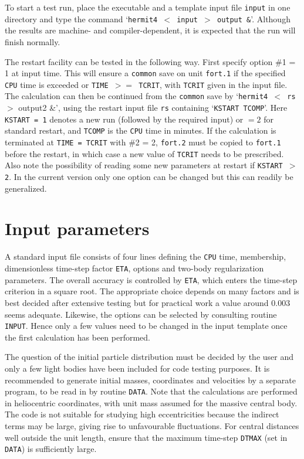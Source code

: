 \documentclass[12pt]{article}
\begin{document}
To start a test run, place the executable and a template input file
{\tt input} in one directory and type the command
`{\tt hermit4 $<$ input $>$ output \&}'.
Although the results are machine- and compiler-dependent, it is expected that
the run will finish normally.

The restart facility can be tested in the following way.
First specify option \#1 = 1 at input time.
This will ensure a {\tt common} save on unit {\tt fort.1} if the specified
{\tt CPU} time is exceeded or {\tt TIME $>=$ TCRIT}, with {\tt TCRIT} given
in the input file.
The calculation can then be continued from the {\tt common} save by
`{\tt hermit4 $<$ rs $>$} output2 \&',
using the restart input file {\tt rs} containing `{\tt KSTART TCOMP}'.
Here {\tt KSTART = 1} denotes a new run (followed by the required input)
or $= 2$ for standard restart, and {\tt TCOMP} is the {\tt CPU} time in
minutes.
If the calculation is terminated at {\tt TIME = TCRIT} with \#2 = 2, 
{\tt fort.2} must be copied to {\tt fort.1} before the restart, in which
case a new value of {\tt TCRIT} needs to be prescribed.
Also note the possibility of reading some new parameters at restart if
{\tt KSTART $>$ 2}.
In the current version only one option can be changed but this can readily
be generalized.

\section{Input parameters}

A standard input file consists of four lines defining the {\tt CPU} time,
membership, dimensionless time-step factor {\tt ETA}, options and two-body
regularization parameters.
The overall accuracy is controlled by {\tt ETA}, which enters the time-step
criterion in a square root.
The appropriate choice depends on many factors and is best decided
after extensive testing but for practical work a value around 0.003 seems
adequate.
Likewise, the options can be selected by consulting routine {\tt INPUT}.
Hence only a few values need to be changed in the input template once the
first calculation has been performed.

The question of the initial particle distribution must be decided by the
user and only a few light bodies have been included for code testing
purposes.
It is recommended to generate initial masses, coordinates and velocities
by a separate program, to be read in by routine {\tt DATA}.
Note that the calculations are performed in heliocentric coordinates,
with unit mass assumed for the massive central body.
The code is not suitable for studying high eccentricities because the
indirect terms may be large, giving rise to unfavourable fluctuations.
For central distances well outside the unit length, ensure that the
maximum time-step {\tt DTMAX} (set in {\tt DATA}) is sufficiently large.
\end{document}
